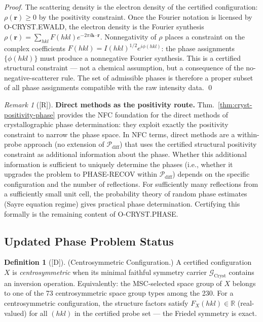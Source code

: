 \documentclass[12pt,oneside]{amsbook}
\theoremstyle{plain}
\theoremstyle{definition}
\newtheorem{definition}[theorem]{Definition}
\theoremstyle{remark}
\newtheorem{remark}[theorem]{Remark}
\newcommand{\status}[1]{\textup{[#1]}}
\begin{document}
\begin{proof}
The scattering density is the electron density of the certified
configuration: $\rho(\mathbf{r}) \ge 0$ by the positivity
constraint.  Once the Fourier notation is licensed by
O-CRYST.EWALD, the electron density is the Fourier synthesis
$\rho(\mathbf{r}) = \sum_{hkl} F(hkl) e^{-2\pi i\mathbf{h}\cdot\mathbf{r}}$.
Nonnegativity of $\rho$ places a constraint on the complex
coefficients $F(hkl) = I(hkl)^{1/2} e^{i\phi(hkl)}$: the
phase assignments $\{\phi(hkl)\}$ must produce a nonnegative
Fourier synthesis.  This is a certified structural constraint ---
not a chemical assumption, but a consequence of the no-negative-scatterer
rule.  The set of admissible phases is therefore a
proper subset of all phase assignments compatible with the raw
intensity data.
\qed
\end{proof}

\begin{remark}[\status{R}]\label{rem:cryst-direct-methods}
\textbf{Direct methods as the positivity route.}
Thm.~\ref{thm:cryst-positivity-phase} provides the NFC
foundation for the direct methods of crystallographic phase
determination: they exploit exactly the positivity constraint
to narrow the phase space.  In NFC terms, direct methods are
a within-probe approach (no extension of
$\mathcal{P}_{\mathrm{diff}}$) that uses the certified structural
positivity constraint as additional information about the phase.
Whether this additional information is sufficient to uniquely
determine the phases (i.e., whether it upgrades the problem to
PHASE-RECOV within $\mathcal{P}_{\mathrm{diff}}$) depends on
the specific configuration and the number of reflections.  For
sufficiently many reflections from a sufficiently small unit
cell, the probability theory of random phase estimates
(Sayre equation regime) gives practical phase determination.
Certifying this formally is the remaining content of
O-CRYST.PHASE.
\end{remark}

\subsection{Updated Phase Problem Status}

\begin{definition}[\status{D}]\label{def:cryst-centrosymmetric}
\textup{(Centrosymmetric Configuration.)}
A certified configuration $X$ is \emph{centrosymmetric} when its
minimal faithful symmetry carrier $\mathcal{G}_{\mathrm{Cryst}}$
contains an inversion operation.  Equivalently: the MSC-selected
space group of $X$ belongs to one of the 73 centrosymmetric
space group types among the 230.  For a centrosymmetric
configuration, the structure factors satisfy
$F_X(hkl) \in \mathbb{R}$ (real-valued) for all $(hkl)$ in
the certified probe set --- the Friedel symmetry is exact.
\end{definition}
\end{document}
